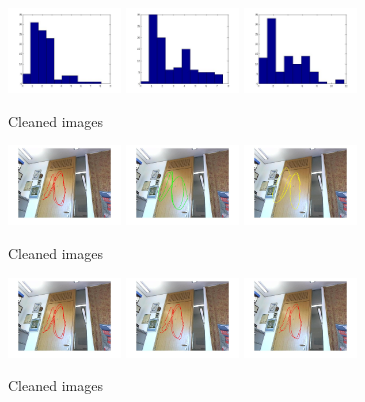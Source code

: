 \documentclass[10pt,a4paper,oneclumn]{article}
\begin{document}
\begin{figure}[h!]
\centering
  \includegraphics[width=3cm]{redHistMedian.jpg}
  \includegraphics[width=3cm]{greenHistMedian.jpg}
  \includegraphics[width=3cm]{yellowHistMedian.jpg}
\caption{Cleaned images}
\end{figure}

\begin{figure}[h!]
\centering
  \includegraphics[width=3cm]{redMean.jpg}
  \includegraphics[width=3cm]{greenMean.jpg}
  \includegraphics[width=3cm]{yellowMean.jpg}
\caption{Cleaned images}
\end{figure}

\begin{figure}[h!]
\centering
  \includegraphics[width=3cm]{redMean.jpg}
  \includegraphics[width=3cm]{redBound.jpg}
  \includegraphics[width=3cm]{medianRedTrack.jpg}
\caption{Cleaned images}
\end{figure}
\end{document}
